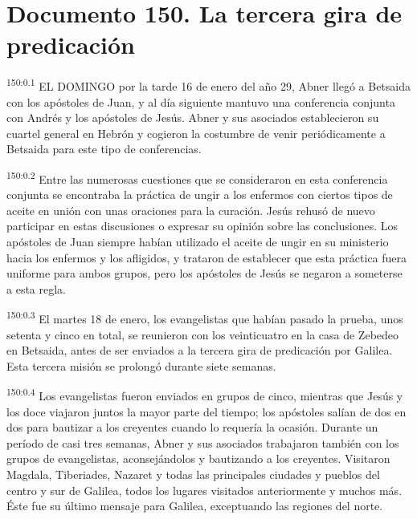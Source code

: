 \chapter{Documento 150. La tercera gira de predicación}
\par 
\textsuperscript{150:0.1} EL DOMINGO por la tarde 16 de enero del año 29, Abner llegó a Betsaida con los apóstoles de Juan, y al día siguiente mantuvo una conferencia conjunta con Andrés y los apóstoles de Jesús. Abner y sus asociados establecieron su cuartel general en Hebrón y cogieron la costumbre de venir periódicamente a Betsaida para este tipo de conferencias.

\par 
\textsuperscript{150:0.2} Entre las numerosas cuestiones que se consideraron en esta conferencia conjunta se encontraba la práctica de ungir a los enfermos con ciertos tipos de aceite en unión con unas oraciones para la curación. Jesús rehusó de nuevo participar en estas discusiones o expresar su opinión sobre las conclusiones. Los apóstoles de Juan siempre habían utilizado el aceite de ungir en su ministerio hacia los enfermos y los afligidos, y trataron de establecer que esta práctica fuera uniforme para ambos grupos, pero los apóstoles de Jesús se negaron a someterse a esta regla.

\par 
\textsuperscript{150:0.3} El martes 18 de enero, los evangelistas que habían pasado la prueba, unos setenta y cinco en total, se reunieron con los veinticuatro en la casa de Zebedeo en Betsaida, antes de ser enviados a la tercera gira de predicación por Galilea. Esta tercera misión se prolongó durante siete semanas.

\par 
\textsuperscript{150:0.4} Los evangelistas fueron enviados en grupos de cinco, mientras que Jesús y los doce viajaron juntos la mayor parte del tiempo; los apóstoles salían de dos en dos para bautizar a los creyentes cuando lo requería la ocasión. Durante un período de casi tres semanas, Abner y sus asociados trabajaron también con los grupos de evangelistas, aconsejándolos y bautizando a los creyentes. Visitaron Magdala, Tiberiades, Nazaret y todas las principales ciudades y pueblos del centro y sur de Galilea, todos los lugares visitados anteriormente y muchos más. Éste fue su último mensaje para Galilea, exceptuando las regiones del norte.

